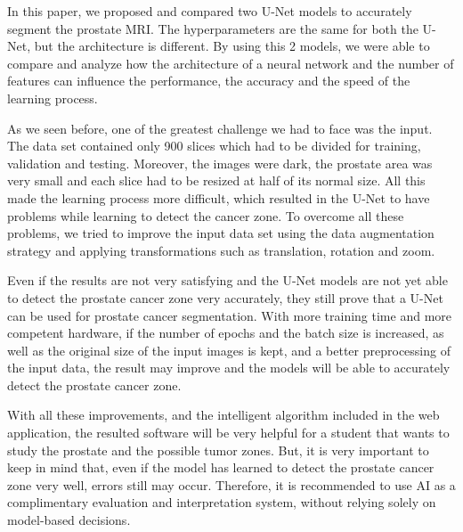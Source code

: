 \documentclass[runningheads,a4paper,11pt]{report}
\begin{document}
In this paper, we proposed and compared two U-Net models to accurately segment the prostate MRI. The hyperparameters are the same for both the U-Net, but the architecture is different. By using this 2 models, we were able to compare and analyze how the architecture of a neural network and the number of features can influence the performance, the accuracy and the speed of the learning process.\par
As we seen before, one of the greatest challenge we had to face was the input. The data set contained only 900 slices which had to be divided for training, validation and testing. Moreover, the images were dark, the prostate area was very small and each slice had to be resized at half of its normal size. All this made the learning process more difficult, which resulted in the U-Net to have problems while learning to detect the cancer zone. To overcome all these problems, we tried to improve the input data set using the data augmentation strategy and applying transformations such as translation, rotation and zoom.\par
Even if the results are not very satisfying and the U-Net models are not yet able to detect the prostate cancer zone very accurately, they still prove that a U-Net can be used for prostate cancer segmentation. With more training time and more competent hardware, if the number of epochs and the batch size is increased, as well as the original size of the input images is kept, and a better preprocessing of the input data, the result may improve and the models will be able to accurately detect the prostate cancer zone.\par
With all these improvements, and the intelligent algorithm included in the web application, the resulted software will be very helpful for a student that wants to study the prostate and the possible tumor zones. But, it is very important to keep in mind that, even if the model has learned to detect the prostate cancer zone very well, errors still may occur. Therefore, it is recommended to use AI as a complimentary evaluation and interpretation system, without relying solely on model-based decisions.



\end{document}
